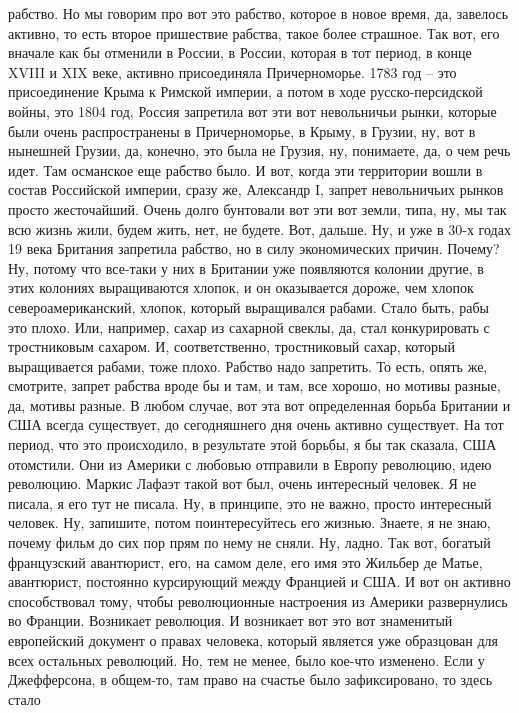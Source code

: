 рабство. Но мы говорим про вот это рабство, которое в новое время, да, завелось
активно, то есть второе пришествие рабства, такое более страшное. Так вот, его
вначале как бы отменили в России, в России, которая в тот период, в конце XVIII
и XIX веке, активно присоединяла Причерноморье. 1783 год – это присоединение
Крыма к Римской империи, а потом в ходе русско-персидской войны, это 1804 год,
Россия запретила вот эти вот невольничьи рынки, которые были очень
распространены в Причерноморье, в Крыму, в Грузии, ну, вот в нынешней Грузии,
да, конечно, это была не Грузия, ну, понимаете, да, о чем речь идет. Там
османское еще рабство было. И вот, когда эти территории вошли в состав
Российской империи, сразу же, Александр I, запрет невольничьих рынков просто
жесточайший. Очень долго бунтовали вот эти вот земли, типа, ну, мы так всю жизнь
жили, будем жить, нет, не будете. Вот, дальше. Ну, и уже в 30-х годах 19 века
Британия запретила рабство, но в силу экономических причин. Почему? Ну, потому
что все-таки у них в Британии уже появляются колонии другие, в этих колониях
выращиваются хлопок, и он оказывается дороже, чем хлопок североамериканский,
хлопок, который выращивался рабами. Стало быть, рабы это плохо. Или, например,
сахар из сахарной свеклы, да, стал конкурировать с тростниковым сахаром. И,
соответственно, тростниковый сахар, который выращивается рабами, тоже плохо.
Рабство надо запретить. То есть, опять же, смотрите, запрет рабства вроде бы и
там, и там, все хорошо, но мотивы разные, да, мотивы разные. В любом случае, вот
эта вот определенная борьба Британии и США всегда существует, до сегодняшнего
дня очень активно существует. На тот период, что это происходило, в результате
этой борьбы, я бы так сказала, США отомстили. Они из Америки с любовью отправили
в Европу революцию, идею революцию. Маркис Лафаэт такой вот был, очень
интересный человек. Я не писала, я его тут не писала. Ну, в принципе, это не
важно, просто интересный человек. Ну, запишите, потом поинтересуйтесь его
жизнью. Знаете, я не знаю, почему фильм до сих пор прям по нему не сняли. Ну,
ладно. Так вот, богатый французский авантюрист, его, на самом деле, его имя это
Жильбер де Матье, авантюрист, постоянно курсирующий между Францией и США. И вот
он активно способствовал тому, чтобы революционные настроения из Америки
развернулись во Франции. Возникает революция. И возникает вот это вот знаменитый
европейский документ о правах человека, который является уже образцован для всех
остальных революций. Но, тем не менее, было кое-что изменено. Если у
Джефферсона, в общем-то, там право на счастье было зафиксировано, то здесь стало
